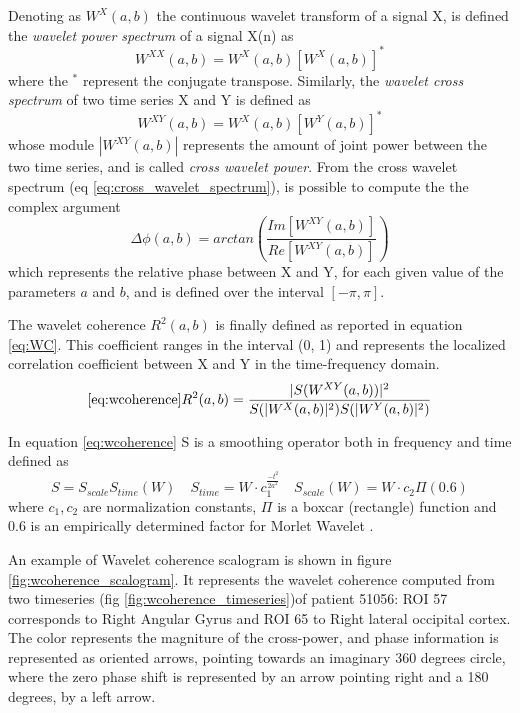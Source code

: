 \documentclass[10pt]{report}
\begin{document}
Denoting as $W^{X}(a, b)$ the continuous wavelet transform of a signal X, is defined the \emph{wavelet power spectrum} of a signal X(n) as
\begin{equation}
W^{XX}(a, b) = W^X(a, b) \left[W^X(a, b)\right]^{\ast}
\end{equation}
where the $^{\ast}$ represent the conjugate transpose.
Similarly, the \emph{wavelet cross spectrum} of two time series X and Y is defined as
\begin{equation}\label{eq:cross_wavelet_spectrum}
W^{XY}(a, b) = W^X(a, b)[W^Y(a, b)]^\ast
\end{equation}
whose module $|W^{XY}(a, b)|$ represents the amount of joint power between the two time series, and is called \emph{cross wavelet power}.
From the cross wavelet spectrum (eq \ref{eq:cross_wavelet_spectrum}), is possible to compute the the complex argument
\begin{equation}\label{eq:wavelet_phase}
\Delta \phi (a, b) = arctan\left(\frac{Im\left[ W^{XY}(a, b)\right]}{Re\left[ W^{XY}(a, b)\right]} \right)
\end{equation}
which represents the relative phase between X and Y, for each given value of the parameters $a$ and $b$, and is defined over the interval $[-\pi, \pi]$.

The wavelet coherence $R^2(a, b)$ is finally defined as reported in equation \ref{eq:WC}. This coefficient ranges in the interval (0, 1) and represents the localized correlation coefficient between X and Y in the time-frequency domain.
\begin{equation}\ref{eq:wcoherence}
R^2(a, b) = \frac{|S(W^{XY}(a,b))|^2}{S(|W^X(a,b)|^2) S(|W^Y(a,b)|^2)}
\label{eq:WC}
\end{equation}

In equation \ref{eq:wcoherence} S is a smoothing operator both in frequency and time defined as \cite{torrence-1999} \cite{grinsted-2004}
\[
S = S_{scale}S_{time}(W) \quad S_{time} = W\cdot c_1 ^{\frac{-t^2}{2a^2}} \quad S_{scale}(W) = W\cdot c_2 \Pi(0.6)
\]
where $c_1, c_2$ are normalization constants, $\Pi$ is a boxcar (rectangle) function and 0.6 is an empirically determined factor for Morlet Wavelet \cite{torrence-1998}.

An example of Wavelet coherence scalogram is shown in figure \ref{fig:wcoherence_scalogram}. It represents the wavelet coherence computed from two timeseries (fig \ref{fig:wcoherence_timeseries})of patient 51056: ROI 57 corresponds to Right Angular Gyrus and ROI 65 to Right lateral occipital cortex.
The color represents the magniture of the cross-power, and phase information is represented as oriented arrows, pointing towards an imaginary 360 degrees circle, where the zero phase shift is represented by an arrow pointing right and a 180 degrees, by a left arrow.
\end{document}
